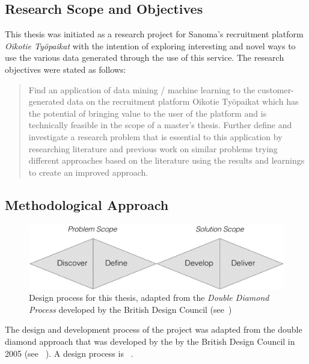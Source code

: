 \subsection{Research Scope and Objectives}
\label{sub:Research Objectives}

This thesis was initiated as a research project for Sanoma's recruitment platform \emph{Oikotie Työpaikat} with the intention of exploring interesting and novel ways to use the various data generated through the use of this service. The research objectives were stated as follows:

\blockquote{Find an application of data mining / machine learning to the customer-generated data on the recruitment platform Oikotie Työpaikat which has the potential of bringing value to the user of the platform and is technically feasible in the scope of a master’s thesis. Further define and investigate a research problem that is essential to this application by researching literature and previous work on similar problems trying different approaches based on the literature using the results and learnings to create an improved approach.}



\subsection{Methodological Approach}
\label{sub:Methodological Approach}

\begin{figure}[h]
    \centering
    \includegraphics[width=\textwidth]{img/double-diamond.pdf}
    \caption{Design process for this thesis, adapted from the \emph{Double Diamond Process} developed by the British Design Council (see~\cite{Council:2007aa})}
\label{fig:double-diamond}
\end{figure}

The design and development process of the project was adapted from the double diamond approach that was developed by the by the British Design Council in 2005 (see ~\cite{Council:2007aa}). A design process is ~\cite{Best:2006aa}.

